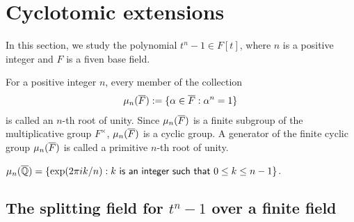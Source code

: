 \section{Cyclotomic extensions}

In this section, we study the polynomial $t^n-1\in F[t]$, where $n$ is a positive integer and $F$ is a fiven base field.

\begin{defi}
    For a positive integer $n$, every member of the collection
    \begin{align*}
        \mu_n(\overline{F}):=\{\alpha\in\overline{F}: \alpha^n=1\}
    \end{align*}
    is called an $n$-th root of unity.
    Since $\mu_n(\overline{F})$ is a finite subgroup of the multiplicative group $F^\times$, $\mu_n(\overline{F})$ is a cyclic group.
    A generator of the finite cyclic group $\mu_n(\overline{F})$ is called a primitive $n$-th root of unity.
\end{defi}
\begin{exmp}
    $\mu_n(\overline{{\mathbb{Q}}})=\{\exp(2\pi i k/n): \textsf{$k$ is an integer such that $0\leq k\leq n-1$}\}$.
\end{exmp}

\subsection{The splitting field for $t^n-1$ over a finite field}

